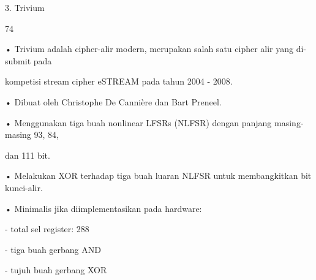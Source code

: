 \documentclass{article}
\begin{document}

3. Trivium

74

• Trivium adalah cipher-alir modern, merupakan salah satu cipher alir yang di-submit pada 

kompetisi stream cipher eSTREAM pada tahun 2004  - 2008.  

• Dibuat oleh Christophe De Cannière dan Bart Preneel.

• Menggunakan tiga buah nonlinear LFSRs (NLFSR) dengan panjang masing-masing 93, 84, 

dan 111 bit.

• Melakukan XOR terhadap tiga buah luaran NLFSR untuk membangkitkan bit kunci-alir.  

• Minimalis jika diimplementasikan pada hardware:


- total sel register: 288


- tiga buah gerbang AND


- tujuh buah gerbang XOR
\end{document}
